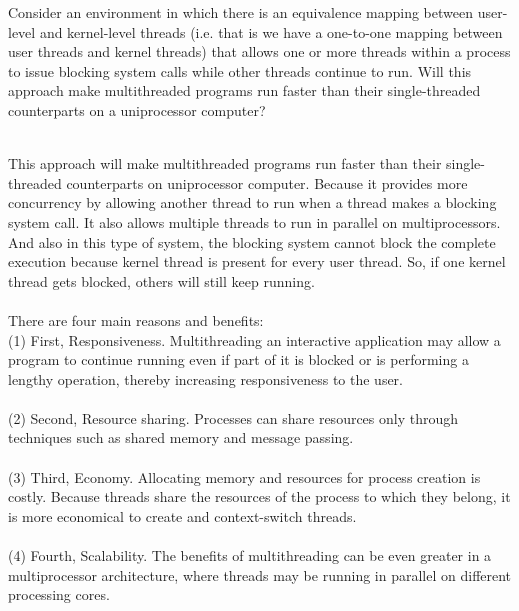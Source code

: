 \documentclass[12pt]{article}
\newenvironment{sol}[1][Solution]{\begin{trivlist}\item[\hskip\labelsep {\bfseries #1:}]}{\end{trivlist}}
\begin{document}
\begin{enumerate}
\newpage
\item Consider an environment in which there is an equivalence mapping between user-level and kernel-level threads (i.e. that is we have a one-to-one mapping between user threads and kernel threads) that allows one or more threads within a process to issue blocking system calls while other threads continue to run. Will this approach make multithreaded programs run faster than their single-threaded counterparts on a uniprocessor computer?
\begin{sol}
\hspace*{\fill} \\
This approach will make multithreaded programs run faster than their single-threaded counterparts on uniprocessor computer. Because it provides more concurrency by allowing another thread to run when a thread makes a blocking system call. It also allows multiple threads to run in parallel on multiprocessors. And also in this type of system, the blocking system cannot block the complete execution because kernel thread is present for every user thread. So, if one kernel thread gets blocked, others will still keep running. \\
\\
There are four main reasons and benefits: \\
(1) First, Responsiveness. Multithreading an interactive application may allow a program to continue running even if part of it is blocked or is performing a lengthy operation, thereby increasing responsiveness to the user. \\
\\
(2) Second, Resource sharing. Processes can share resources only through techniques such as shared memory and message passing. \\
\\
(3) Third, Economy. Allocating memory and resources for process creation is costly. Because threads share the resources of the process to which they belong, it is more economical to create and context-switch threads.\\
\\
(4) Fourth, Scalability. The benefits of multithreading can be even greater in a multiprocessor architecture, where threads may be running in parallel on different processing cores.\\

\end{sol}


\end{enumerate}
\end{document}
